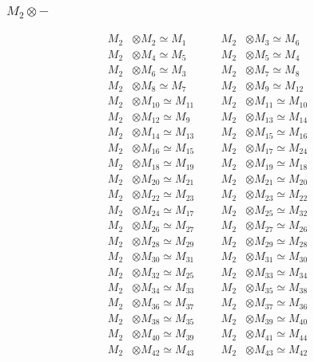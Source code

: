 \subsubsection{$ M_{2}\otimes -$}
\begin{align*}
M_{2} &\otimes M_{2} \simeq M_{1} &&& M_{2} &\otimes M_{3} \simeq M_{6}\\
M_{2} &\otimes M_{4} \simeq M_{5} &&& M_{2} &\otimes M_{5} \simeq M_{4}\\
M_{2} &\otimes M_{6} \simeq M_{3} &&& M_{2} &\otimes M_{7} \simeq M_{8}\\
M_{2} &\otimes M_{8} \simeq M_{7} &&& M_{2} &\otimes M_{9} \simeq M_{12}\\
M_{2} &\otimes M_{10} \simeq M_{11} &&& M_{2} &\otimes M_{11} \simeq M_{10}\\
M_{2} &\otimes M_{12} \simeq M_{9} &&& M_{2} &\otimes M_{13} \simeq M_{14}\\
M_{2} &\otimes M_{14} \simeq M_{13} &&& M_{2} &\otimes M_{15} \simeq M_{16}\\
M_{2} &\otimes M_{16} \simeq M_{15} &&& M_{2} &\otimes M_{17} \simeq M_{24}\\
M_{2} &\otimes M_{18} \simeq M_{19} &&& M_{2} &\otimes M_{19} \simeq M_{18}\\
M_{2} &\otimes M_{20} \simeq M_{21} &&& M_{2} &\otimes M_{21} \simeq M_{20}\\
M_{2} &\otimes M_{22} \simeq M_{23} &&& M_{2} &\otimes M_{23} \simeq M_{22}\\
M_{2} &\otimes M_{24} \simeq M_{17} &&& M_{2} &\otimes M_{25} \simeq M_{32}\\
M_{2} &\otimes M_{26} \simeq M_{27} &&& M_{2} &\otimes M_{27} \simeq M_{26}\\
M_{2} &\otimes M_{28} \simeq M_{29} &&& M_{2} &\otimes M_{29} \simeq M_{28}\\
M_{2} &\otimes M_{30} \simeq M_{31} &&& M_{2} &\otimes M_{31} \simeq M_{30}\\
M_{2} &\otimes M_{32} \simeq M_{25} &&& M_{2} &\otimes M_{33} \simeq M_{34}\\
M_{2} &\otimes M_{34} \simeq M_{33} &&& M_{2} &\otimes M_{35} \simeq M_{38}\\
M_{2} &\otimes M_{36} \simeq M_{37} &&& M_{2} &\otimes M_{37} \simeq M_{36}\\
M_{2} &\otimes M_{38} \simeq M_{35} &&& M_{2} &\otimes M_{39} \simeq M_{40}\\
M_{2} &\otimes M_{40} \simeq M_{39} &&& M_{2} &\otimes M_{41} \simeq M_{44}\\
M_{2} &\otimes M_{42} \simeq M_{43} &&& M_{2} &\otimes M_{43} \simeq M_{42}\\

\end{align*}
